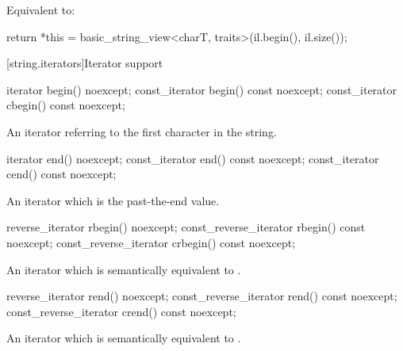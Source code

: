 \begin{itemdescr}
\pnum
\effects Equivalent to:
\begin{codeblock}
return *this = basic_string_view<charT, traits>(il.begin(), il.size());
\end{codeblock}
\end{itemdescr}

[string.iterators]{Iterator support}

%
%
\begin{itemdecl}
iterator       begin() noexcept;
const_iterator begin() const noexcept;
const_iterator cbegin() const noexcept;
\end{itemdecl}

\begin{itemdescr}
\pnum
\returns
An iterator referring to the first character in the string.
\end{itemdescr}

%
%
\begin{itemdecl}
iterator       end() noexcept;
const_iterator end() const noexcept;
const_iterator cend() const noexcept;
\end{itemdecl}

\begin{itemdescr}
\pnum
\returns
An iterator which is the past-the-end value.
\end{itemdescr}

%
%
\begin{itemdecl}
reverse_iterator       rbegin() noexcept;
const_reverse_iterator rbegin() const noexcept;
const_reverse_iterator crbegin() const noexcept;
\end{itemdecl}

\begin{itemdescr}
\pnum
\returns
An iterator which is semantically equivalent to
.
\end{itemdescr}

%
%
\begin{itemdecl}
reverse_iterator       rend() noexcept;
const_reverse_iterator rend() const noexcept;
const_reverse_iterator crend() const noexcept;
\end{itemdecl}

\begin{itemdescr}
\pnum
\returns
An iterator which is semantically equivalent to
.
\end{itemdescr}

